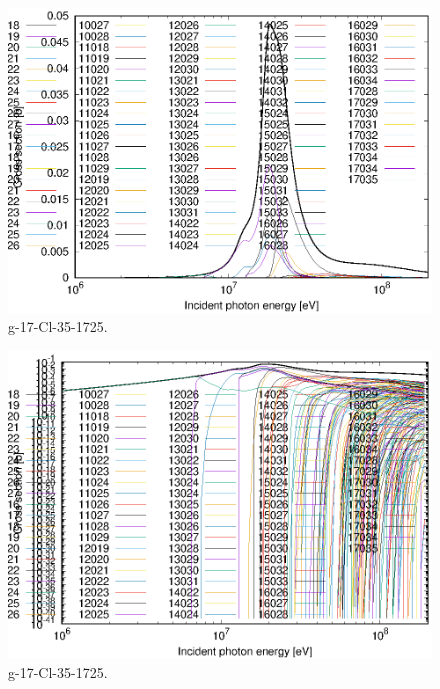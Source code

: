 \begin{figure}
 \includegraphics[width=\linewidth]{eps/g_17-Cl-35_1725.eps}
  \caption{g-17-Cl-35-1725.}
\end{figure}
\begin{figure}
 \includegraphics[width=\linewidth]{eps-log/g_17-Cl-35_1725.eps}
 \caption{g-17-Cl-35-1725.}
\end{figure}
\newpage \clearpage

